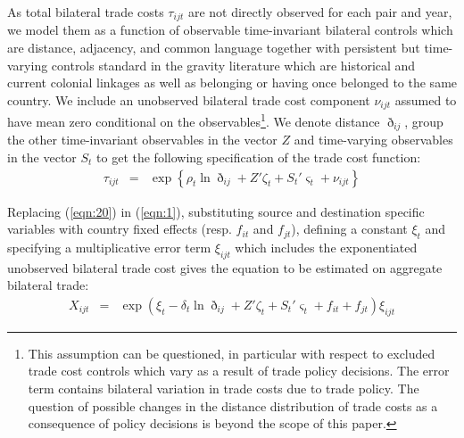 \documentclass[12pt,twoside,a4paper,notitlepage]{article}
\begin{document}
As total bilateral trade costs $\tau_{ijt}$ are not directly observed for each pair and year, we model them as a function of observable time-invariant bilateral controls which are distance, adjacency, and common language together with persistent but time-varying controls standard in the gravity literature which are historical and current colonial linkages as well as belonging or having once belonged to the same country.
We include an unobserved bilateral trade cost component $\nu_{ijt}$ assumed to have mean zero conditional on the observables\footnote{ This assumption can be questioned, in particular with respect to excluded trade cost controls which vary as a result of trade policy decisions.
\fi The error term contains bilateral variation in trade costs due to trade policy.
The question of possible changes in the distance distribution of trade costs as a consequence of policy decisions is beyond the scope of this paper.}.
We denote distance $\eth_{ij}$, group the other time-invariant observables in the vector $Z$ and time-varying observables in the vector $S_t$ to get the following specification of the trade cost function:
\begin{eqnarray}
\tau_{ijt}&=&\exp\left\{\rho_t\ln{\eth_{ij}}+{Z}'\zeta_{t}+{S_t}'\varsigma_{t}+\nu_{ijt}\right\} \label{eqn:20}
\end{eqnarray}

Replacing (\ref{eqn:20}) in (\ref{eqn:1}), substituting source and destination specific variables with country fixed effects (resp.
$f_{it}$ and $f_{jt}$), defining a constant $\xi_t$ and specifying a multiplicative error term $\xi_{ijt}$ which includes the exponentiated unobserved bilateral trade cost gives the equation to be estimated on aggregate bilateral trade: 
\begin{eqnarray}
X_{ijt}&=&\exp{\left(\xi_t-\delta_{t}\ln{\eth_{ij}}+{Z}'\zeta_t+{S_t}'\varsigma_t+f_{it}+f_{jt}\right)\xi_{ijt}} \label{eqn:4}
\end{eqnarray}
 
\end{document}

